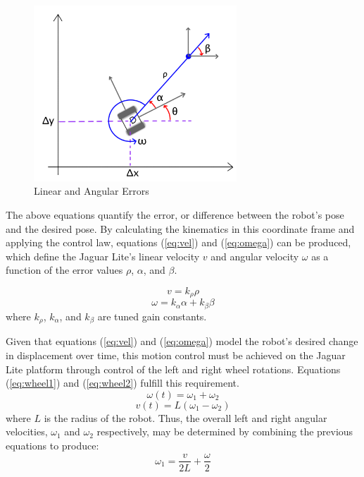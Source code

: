 \documentclass[conference]{IEEEtran}
\begin{document}
\begin{figure}
\centering
\includegraphics[width = 3in]{pic2.png}
\caption{Linear and Angular Errors}
\label{fig3}
\end{figure}

The above equations quantify the error, or difference between the robot's pose and
the desired pose.  By calculating the kinematics in this coordinate frame and applying the control law, equations (\ref{eq:vel}) and (\ref{eq:omega}) can be produced, which define the
Jaguar Lite's linear velocity $v$ and angular velocity $\omega$ as a 
function of the error values $\rho$, $\alpha$, and $\beta$.  

\begin{equation}\label{eq:vel}
v = k_{\rho} \rho
\end{equation}
\begin{equation}\label{eq:omega}
\omega = k_{\alpha} \alpha  +  k_{\beta} \beta 
\end{equation}
where $k_{\rho}$, $k_{\alpha}$, and $k_{\beta}$ are tuned gain constants.

Given that equations  (\ref{eq:vel}) and (\ref{eq:omega}) model the robot's desired
 change in displacement over time, this motion control must be achieved on the Jaguar Lite platform
through control of the left and right wheel rotations.  Equations (\ref{eq:wheel1}) and (\ref{eq:wheel2}) fulfill 
this requirement.
\begin{equation}\label{eq:wheel1}
\omega(t) = \omega_1 + \omega_2 
\end{equation} 
\begin{equation}\label{eq:wheel2}
v(t) = L \left( \omega_1 - \omega_2 \right)
\end{equation}
where $L$ is the radius of the robot.
Thus, the overall left and right angular velocities, $\omega_1$ and $\omega_2$ respectively, may 
be determined by combining the previous equations to produce:
\begin{equation}
\omega_1 = \frac{v}{2L} + \frac{\omega}{2}
\end{equation}
\end{document}
